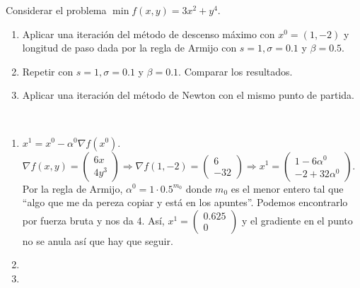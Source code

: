 \documentclass[twoside]{article}
\begin{document}
\newpage
\begin{ejercicio}{6}
Considerar el problema $\min f(x,y)=3x^2+y^4$.
\begin{enumerate}
\item Aplicar una iteración del método de descenso máximo con $x^0=(1,-2)$ y longitud de paso dada por la regla de Armijo con $s=1,\sigma=0.1$ y $\beta=0.5$. 
\item Repetir con $s=1,\sigma=0.1$ y $\beta=0.1$. Comparar los resultados.
\item Aplicar una iteración del método de Newton con el mismo punto de partida.
\end{enumerate}
\end{ejercicio}
\begin{solucion}\
\begin{enumerate}
\item $x^1=x^0-\alpha^0\nabla f(x^0)$. $\nabla f(x,y)=\begin{pmatrix}
6x\\
4y^3
\end{pmatrix}\Rightarrow \nabla f(1,-2)=\begin{pmatrix}
6\\
-32
\end{pmatrix}\Rightarrow x^1=\begin{pmatrix}
1-6\alpha^0\\
-2+32\alpha^0
\end{pmatrix}$. Por la regla de Armijo, $\alpha^0=1\cdot 0.5^{m_0}$ donde $m_0$ es el menor entero tal que ``algo que me da pereza copiar y está en los apuntes''. Podemos encontrarlo por fuerza bruta y nos da 4. Así, $x^1=\begin{pmatrix}
0.625\\
0
\end{pmatrix}$ y el gradiente en el punto no se anula así que hay que seguir.
\item
\item 
\end{enumerate}
\end{solucion}

\newpage
\end{document}
